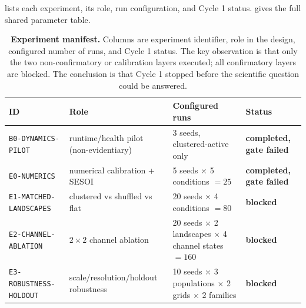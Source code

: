 \documentclass[11pt,a4paper]{article}
\newcommand{\code}[1]{\texttt{#1}}
\begin{document}
 lists each experiment, its role, run configuration, and
Cycle 1 status.  gives the full shared parameter table.

\begin{table}[htbp]
\centering
\small
\begin{tabular}{@{}lp{4.0cm}p{3.9cm}p{2.5cm}@{}}
\toprule
\textbf{ID} & \textbf{Role} & \textbf{Configured runs} & \textbf{Status} \\
\midrule
\code{B0-DYNAMICS-PILOT} & runtime/health pilot (non-evidentiary) & 3 seeds, clustered-active only & \textbf{completed, gate failed} \\
\code{E0-NUMERICS} & numerical calibration + SESOI & 5 seeds $\times$ 5 conditions $=25$ & \textbf{completed, gate failed} \\
\code{E1-MATCHED-LANDSCAPES} & clustered vs shuffled vs flat & 20 seeds $\times$ 4 conditions $=80$ & \textbf{blocked} \\
\code{E2-CHANNEL-ABLATION} & $2\times2$ channel ablation & 20 seeds $\times$ 2 landscapes $\times$ 4 channel states $=160$ & \textbf{blocked} \\
\code{E3-ROBUSTNESS-HOLDOUT} & scale/resolution/holdout robustness & 10 seeds $\times$ 3 populations $\times$ 2 grids $\times$ 2 families & \textbf{blocked} \\
\bottomrule
\end{tabular}
\caption{\textbf{Experiment manifest.} Columns are experiment identifier, role
in the design, configured number of runs, and Cycle 1 status. The key
observation is that only the two non-confirmatory or calibration layers
executed; all confirmatory layers are blocked. The conclusion is that Cycle 1
stopped before the scientific question could be answered.}
\label{tab:manifest}
\end{table}
\end{document}
